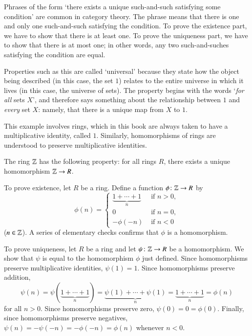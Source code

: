 Phrases of the form `there exists a unique%
%
%
such-and-such satisfying some condition' are common in category theory.
The phrase means that there is one and only one such-and-such satisfying
the condition.  To prove the existence part, we have to show that there is
at least one.  To prove the uniqueness part, we have to show that there is
at most one; in other words, any two such-and-suches satisfying the
condition are equal.

Properties such as this are called `universal' because they state how the
object being described (in this case, the set $1$) relates to the entire
universe in which it lives (in this case, the universe of sets).  The
property begins with the words `\emph{for all} sets $X$', and therefore
says something about the relationship between $1$ and \emph{every} set $X$:
namely, that there is a unique map from $X$ to $1$.

\begin{iexample}
\label{eg:univ-Z}
This example involves rings,%
%
%
which in this book are always taken to have a multiplicative identity,
called $1$.  Similarly, homomorphisms of rings are understood to preserve
multiplicative identities.

The ring $\mathbb{Z}$%
%
%
has the following property: for all rings $R$, there exists a unique
homomorphism $\mathbb{Z} \to R$.

To prove existence, let $R$ be a ring.  Define a function $\phi \from
\integers \to R$ by
\[
\phi(n)
=
\begin{cases}
\underbrace{1 + \cdots + 1}_n   &\text{ if } n > 0,     \\
0                               &\text{ if } n = 0,     \\
-\phi(-n)                       &\text{ if } n < 0
\end{cases}
\]
($n \in \mathbb{Z}$).  A series of elementary checks confirms that $\phi$ is
a homomorphism.

To prove uniqueness, let $R$ be a ring and let $\psi\from \integers \to R$
be a homomorphism.  We show that $\psi$ is equal to the homomorphism $\phi$
just defined.  Since homomorphisms preserve multiplicative identities,
$\psi(1) = 1$.  Since homomorphisms preserve addition,
\[
\psi(n)
=
\psi(\underbrace{1 + \cdots + 1}_n)
=
\underbrace{\psi(1) + \cdots + \psi(1)}_n
=
\underbrace{1 + \cdots + 1}_n
=
\phi(n)
\]
for all $n > 0$.  Since homomorphisms preserve zero, $\psi(0) = 0 = \phi(0)$.
Finally, since homomorphisms preserve negatives, $\psi(n) = -\psi(-n) =
-\phi(-n) = \phi(n)$ whenever $n < 0$.
\end{iexample}

